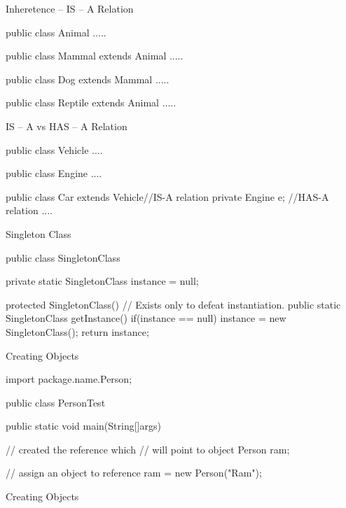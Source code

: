 \documentclass[11pt]{beamer}
\begin{document}
\begin{frame}[containsverbatim]{Inheretence -- IS -- A Relation}
\begin{java}
public class Animal{
	.....
}

  public class Mammal extends Animal{
  	.....
  }

    public class Dog extends Mammal{
    		.....
    }

  public class Reptile extends Animal{
  	.....
  }


\end{java}
\end{frame}


\begin{frame}[containsverbatim]{IS -- A vs HAS -- A Relation}
\begin{java}

public class Vehicle{
  ....
}

public class Engine{
  ....
}

public class Car extends Vehicle{//IS-A relation
  private Engine e;  //HAS-A relation
  ....
}
\end{java}
\end{frame}



\begin{frame}[containsverbatim]{Singleton Class}
\begin{java}
public class SingletonClass{
private static SingletonClass instance = null;
	
	protected SingletonClass(){
		// Exists only to defeat instantiation.
	}
	public static SingletonClass getInstance(){
		if(instance == null){
			instance = new SingletonClass();
		}
		return instance;
	}
}
\end{java}
\end{frame}

\begin{frame}[containsverbatim]{Creating Objects}
\begin{java}
import package.name.Person;

public class PersonTest{

	public static void main(String[]args){
	
		// created the reference which 
		// will point to object
		Person ram;
		
		// assign an object to reference
		ram = new Person("Ram");
	}
}
\end{java}
\end{frame}

\begin{frame}[containsverbatim]{Creating Objects}
\begin{java}

\end{java}
\end{frame}
\end{document}
